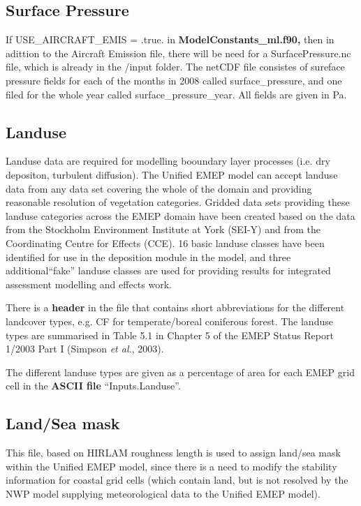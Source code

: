\subsection{Surface Pressure}

If USE\_AIRCRAFT\_EMIS = .true. in { \bf ModelConstants\_ml.f90,} then in adittion to the Aircraft 
Emission file, there will be need for a SurfacePressure.nc file, which is already in the /input folder. 
The netCDF file consistes of sureface pressure fields for each of the months in 2008 called surface_pressure, and one filed for the 
whole year called surface_pressure_year. All fields are given in Pa. 


\subsection{Landuse}

Landuse data are required for modelling booundary layer processes
(i.e. dry depositon, turbulent diffusion).
The Unified EMEP model can accept landuse data from any
data set covering the whole of the domain and providing reasonable 
resolution of vegetation categories. Gridded data sets providing
these landuse categories across the EMEP domain have been created
based on the data from the Stockholm Environment Institute at York 
(SEI-Y) and from the Coordinating Centre for Effects (CCE). 
16 basic landuse classes have been identified for use in the
deposition module in the model, and three additional``fake'' landuse
classes are used for providing results for integrated assessment
modelling and effects work.

There is a {\bf header} in the file that contains short abbreviations 
for the different landcover
types, e.g. CF for temperate/boreal coniferous forest. The landuse
types are summarised in Table 5.1 in Chapter 5 of the EMEP Status
Report 1/2003 Part I (Simpson {\sl et al.}, 2003).

The different landuse types are given as a percentage of area for each 
EMEP grid cell in the {\bf ASCII file} ``Inputs.Landuse''. 



\subsection{Land/Sea mask}
This file, based on HIRLAM roughness length is used
to assign land/sea mask within the Unified EMEP model, since there is
a need to modify the stability information for coastal grid cells
(which contain land, but is not resolved by the NWP model supplying 
meteorological data to the Unified EMEP model). 

